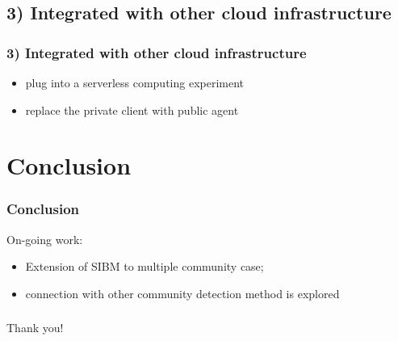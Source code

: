 \documentclass[notheorems]{beamer}
\begin{document}
\subsection{3) Integrated with other cloud infrastructure}
\begin{frame}
\frametitle{3) Integrated with other cloud infrastructure}
\begin{itemize}
\item plug into a serverless computing experiment
\item replace the private client with public agent
\end{itemize}
\begin{figure}
\end{figure}
\end{frame}
\section{Conclusion}
\begin{frame}
\frametitle{Conclusion}
On-going work:
\begin{itemize}
\item Extension of SIBM to multiple community case;
\item connection with other community detection method is explored
\end{itemize}

\end{frame}

\begin{frame}
\frametitle{}
\begin{block}{}
\centering
{\Huge Thank you!}
\end{block}
\end{frame}
\end{document}
